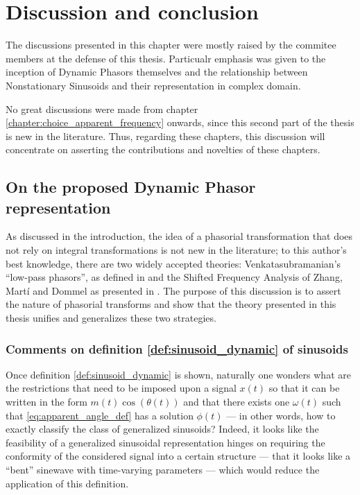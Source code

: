 \chapter{Discussion and conclusion}\label{chapter:discussion_conclusion}

	The discussions presented in this chapter were mostly raised by the commitee members at the defense of this thesis. Particualr emphasis was given to the inception of Dynamic Phasors themselves and the relationship between Nonstationary Sinusoids and their representation in complex domain.

	No great discussions were made from chapter \ref{chapter:choice_apparent_frequency} onwards, since this second part of the thesis is new in the literature. Thus, regarding these chapters, this discussion will concentrate on asserting the contributions and novelties of these chapters.

\section{On the proposed Dynamic Phasor representation}\label{sec:discussion_proposed_representation} %

	As discussed in the introduction, the idea of a phasorial transformation that does not rely on integral transformations is not new in the literature; to this author's best knowledge, there are two widely accepted theories: Venkatasubramanian's ``low-pass phasors'', as defined in \cite{Venkatasubramanian1994} and the Shifted Frequency Analysis of Zhang, Martí and Dommel as presented in \cite{zhangSynchronousMachineModeling2007}. The purpose of this discussion is to assert the nature of phasorial transforms and show that the theory presented in this thesis unifies and generalizes these two strategies.

\subsection{Comments on definition \ref{def:sinusoid_dynamic} of sinusoids}\label{subsec:comments_def_sin} %

	Once definition \ref{def:sinusoid_dynamic} is shown, naturally one wonders what are the restrictions that need to be imposed upon a signal $x(t)$ so that it can be written in the form $m(t)\cos\left(\theta(t)\right)$ and that there exists one $\omega(t)$ such that \ref{eq:apparent_angle_def} has a solution $\phi(t)$ — in other words, how to exactly classify the class of generalized sinusoids? Indeed, it looks like the feasibility of a generalized sinusoidal representation hinges on requiring the conformity of the considered signal into a certain structure — that it looks like a ``bent'' sinewave with time-varying parameters — which would reduce the application of this definition.

